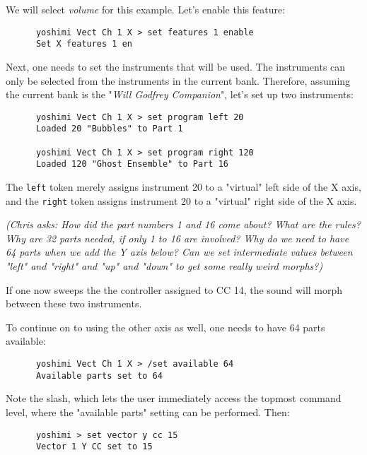    We will select \textsl{volume} for this example.  Let's enable this
   feature:

   \begin{verbatim}
      yoshimi Vect Ch 1 X > set features 1 enable
      Set X features 1 en
   \end{verbatim}

   Next, one needs to set the instruments that will be used.
   The instruments can only be selected from the instruments
   in the current bank. Therefore, assuming the current bank is
   the "\textsl{Will Godfrey Companion}", let's set up two instruments:

   \begin{verbatim}
      yoshimi Vect Ch 1 X > set program left 20
      Loaded 20 "Bubbles" to Part 1

      yoshimi Vect Ch 1 X > set program right 120
      Loaded 120 "Ghost Ensemble" to Part 16
   \end{verbatim}

   The \texttt{left} token merely assigns instrument 20 to a "virtual"
   left side of the X axis,
   and the \texttt{right} token assigns instrument 20 to a "virtual"
   right side of the X axis.

   \textsl{(Chris asks:  How did the part numbers 1 and 16 come about? What
   are the rules?  Why are 32 parts needed, if only 1 to 16 are involved?  Why
   do we need to have 64 parts when we add the Y axis below?  Can we set
   intermediate values between "left" and "right" and "up" and "down" to
   get some really weird morphs?)}

   If one now sweeps the the controller assigned to CC 14,
   the sound will morph between these two instruments.

   To continue on to using the other axis as well, one needs to have 64 parts
   available:

   \begin{verbatim}
      yoshimi Vect Ch 1 X > /set available 64
      Available parts set to 64
   \end{verbatim}

   Note the slash, which lets the user immediately access the topmost command
   level, where the "available parts" setting can be performed.
   Then:

   \begin{verbatim}
      yoshimi > set vector y cc 15
      Vector 1 Y CC set to 15
   \end{verbatim}

